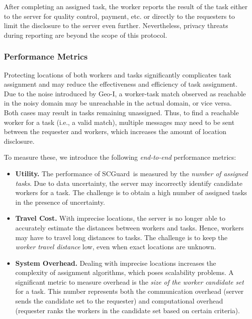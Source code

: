 \documentclass{USC-Thesis}
\renewcommand\bf\bfseries  %
\newcommand{\SCG}{{SCGuard}}
\numberwithin{equation}{chapter}
\begin{document}
After completing an assigned task, the worker reports the result of the task either to the server for quality control, payment, etc. or directly to the requesters to limit the disclosure to the server even further.
Nevertheless, privacy threats during reporting are beyond the scope of this protocol.

\subsubsection{Performance Metrics}
\label{sec:metrics2}

Protecting locations of both workers and tasks significantly complicates task assignment and may reduce the effectiveness and efficiency of task assignment. Due to the noise introduced by Geo-I, a worker-task match observed as reachable in the noisy domain may be unreachable in the actual domain, or vice versa. Both cases may result in tasks remaining unassigned. Thus, to find a reachable worker for a task (i.e., a valid match), multiple messages may need to be sent between the requester and workers, which increases the amount of location disclosure.

To measure these, we introduce the following \emph{end-to-end} performance metrics:
\begin{itemize}
\item
{\bf Utility.} The performance of \SCG\ is measured by the \emph{number of assigned tasks}.
Due to data uncertainty, the server may incorrectly identify candidate workers for a task. The challenge is to obtain a high number of assigned tasks in the presence of uncertainty.
\item
{\bf Travel Cost.} 
With imprecise locations, the server is no longer able to accurately estimate the distances between workers and tasks. Hence, workers may have to travel long distances to tasks. The challenge is to keep the \emph{worker travel distance} low, even when exact locations are unknown.
\item
{\bf System Overhead.} Dealing with imprecise locations increases the complexity of assignment algorithms, which
poses scalability problems. A significant metric to measure overhead is the \emph{size of the worker candidate set} for a task. This number represents both the communication overhead (server sends the candidate set to the requester) and computational overhead (requester ranks the workers in the candidate set based on certain criteria).
\end{itemize}
\end{document}
